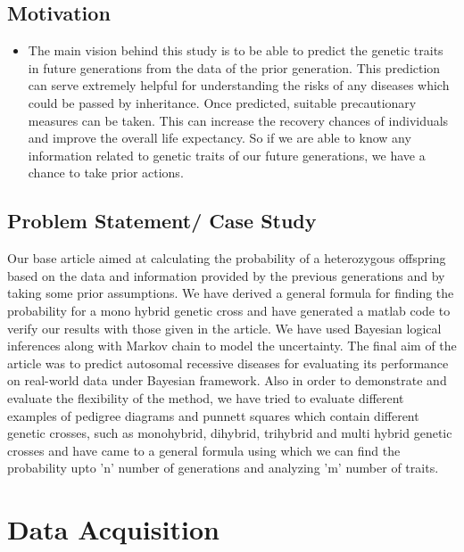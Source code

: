 \documentclass{article}
\begin{document}
\subsection{Motivation}
\begin{itemize}
	\item The main vision behind this study is to be able to predict the genetic traits in future generations from the data of the prior generation. This prediction can serve extremely helpful for understanding the risks of any diseases which could be passed by inheritance. Once predicted, suitable precautionary measures can be taken. This can increase the recovery chances of individuals and improve the overall life expectancy. So if we are able to know any information related to genetic traits of our future generations, we have a chance to take prior actions.
\end{itemize}
\subsection{Problem Statement/ Case Study}
     Our base article aimed at calculating the probability of a heterozygous offspring based on the data and information provided by the previous generations and by taking some prior assumptions. We have derived a general formula for finding the probability for a mono hybrid genetic cross and have generated a matlab code to verify our results with those given in the article. We have used Bayesian logical inferences along with Markov chain to model the uncertainty. The final aim of the article was to predict autosomal recessive diseases for evaluating its performance on real-world data under Bayesian framework. Also in order to demonstrate and evaluate the flexibility of the method, we have tried to evaluate different examples of pedigree diagrams and punnett squares which contain different genetic crosses, such as monohybrid, dihybrid, trihybrid and multi hybrid genetic crosses and have came to a general formula using which we can find the probability upto 'n' number of generations and analyzing  'm' number of traits. 
\section{Data Acquisition }
\end{document}
